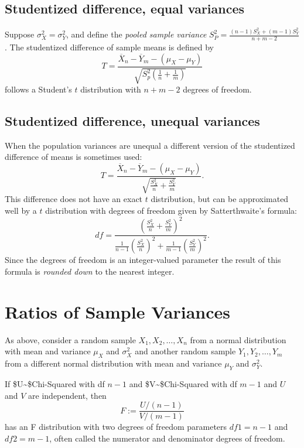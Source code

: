 \documentclass[
]{book}
\begin{document}
\hypertarget{studentized-difference-equal-variances}{%
\subsection{Studentized difference, equal variances}\label{studentized-difference-equal-variances}}

Suppose \(\sigma_X^2 = \sigma_Y^2\), and define the \emph{pooled sample variance} \(S_P^2 = \frac{(n-1)S_X^2 + (m-1)S_Y^2}{n+m-2}\). The studentized difference of sample means is defined by
\[T = \frac{\overline X_n - \overline Y_m - (\mu_X - \mu_Y)}{\sqrt{S_p^2(\frac{1}{n}+\frac{1}{m})}}\]
follows a Student's \(t\) distribution with \(n+m - 2\) degrees of freedom.

\hypertarget{studentized-difference-unequal-variances}{%
\subsection{Studentized difference, unequal variances}\label{studentized-difference-unequal-variances}}

When the population variances are unequal a different version of the studentized difference of means is sometimes used:
\[T = \frac{\overline X_n - \overline Y_m - (\mu_X - \mu_Y)}{\sqrt{\frac{S_X^2}{n}+\frac{S_Y^2}{m}}}.\]
This difference does not have an exact \(t\) distribution, but can be approximated well by a \(t\) distribution with degrees of freedom given by Satterthwaite's formula:
\[df = \frac{\left(\frac{S_X^2}{n}+\frac{S_Y^2}{m}\right)^2}{\frac{1}{n-1}\left(\frac{S_X^2}{n}\right)^2 + \frac{1}{m-1}\left(\frac{S_Y^2}{m}\right)^2}.\]
Since the degrees of freedom is an integer-valued parameter the result of this formula is \emph{rounded down} to the nearest integer.

\hypertarget{ratios-of-sample-variances}{%
\section{Ratios of Sample Variances}\label{ratios-of-sample-variances}}

As above, consider a random sample \(X_1, X_2, \ldots, X_{n}\) from a normal distribution with mean and variance \(\mu_X\) and \(\sigma_X^2\) and another random sample \(Y_1, Y_2, \ldots, Y_m\) from a different normal distribution with mean and variance \(\mu_Y\) and \(\sigma_Y^2\).

If \$U\sim \$Chi-Squared with df \(n-1\) and \$V\sim \$Chi-Squared with df \(m-1\) and \(U\) and \(V\) are independent, then
\[F := \frac{U/(n-1)}{V/(m-1)}\]
has an F distribution with two degrees of freedom parameters \(df1 = n-1\) and \(df2 = m-1\), often called the numerator and denominator degrees of freedom.
\end{document}
